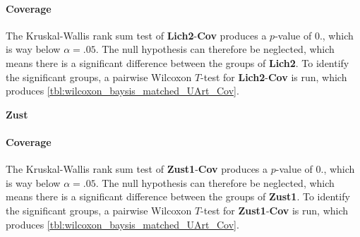 



\paragraph{Coverage}
The Kruskal-Wallis rank sum test of \textbf{Lich2}-\textbf{Cov} produces a $p$-value of 0., which is way below $\alpha=.05$. The null hypothesis can therefore be neglected, which means there is a significant difference between the groups of \textbf{Lich2}. To identify the significant groups, a pairwise Wilcoxon $T$-test for \textbf{Lich2}-\textbf{Cov} is run, which produces \autoref{tbl:wilcoxon_baysis_matched_UArt_Cov}. 





\Large
\centerline{\textbf{Zust}}
\normalsize

\paragraph{Coverage}
The Kruskal-Wallis rank sum test of \textbf{Zust1}-\textbf{Cov} produces a $p$-value of 0., which is way below $\alpha=.05$. The null hypothesis can therefore be neglected, which means there is a significant difference between the groups of \textbf{Zust1}. To identify the significant groups, a pairwise Wilcoxon $T$-test for \textbf{Zust1}-\textbf{Cov} is run, which produces \autoref{tbl:wilcoxon_baysis_matched_UArt_Cov}. 

